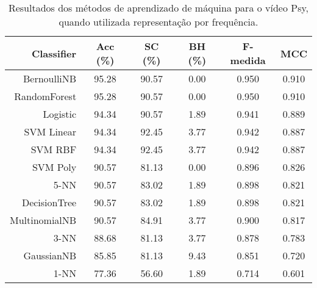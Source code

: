 \begin{table}[!htb]
\centering
\caption{Resultados dos métodos de aprendizado de máquina para o vídeo Psy, quando utilizada representação por frequência.}
\label{tab:Psy-count}
\begin{tabular}{r|c|c|c|c|c}
\hline\hline
Classifier & Acc (\%) & SC (\%) & BH (\%) & F-medida & MCC \\ \hline
BernoulliNB & 95.28 & 90.57 & 0.00 & 0.950 & 0.910 & \\
RandomForest & 95.28 & 90.57 & 0.00 & 0.950 & 0.910 & \\
Logistic & 94.34 & 90.57 & 1.89 & 0.941 & 0.889 & \\
SVM Linear & 94.34 & 92.45 & 3.77 & 0.942 & 0.887 & \\
SVM RBF & 94.34 & 92.45 & 3.77 & 0.942 & 0.887 & \\
SVM Poly & 90.57 & 81.13 & 0.00 & 0.896 & 0.826 & \\
5-NN & 90.57 & 83.02 & 1.89 & 0.898 & 0.821 & \\
DecisionTree & 90.57 & 83.02 & 1.89 & 0.898 & 0.821 & \\
MultinomialNB & 90.57 & 84.91 & 3.77 & 0.900 & 0.817 & \\
3-NN & 88.68 & 81.13 & 3.77 & 0.878 & 0.783 & \\
GaussianNB & 85.85 & 81.13 & 9.43 & 0.851 & 0.720 & \\
1-NN & 77.36 & 56.60 & 1.89 & 0.714 & 0.601 & \\
\hline\hline
\end{tabular}
\end{table}
